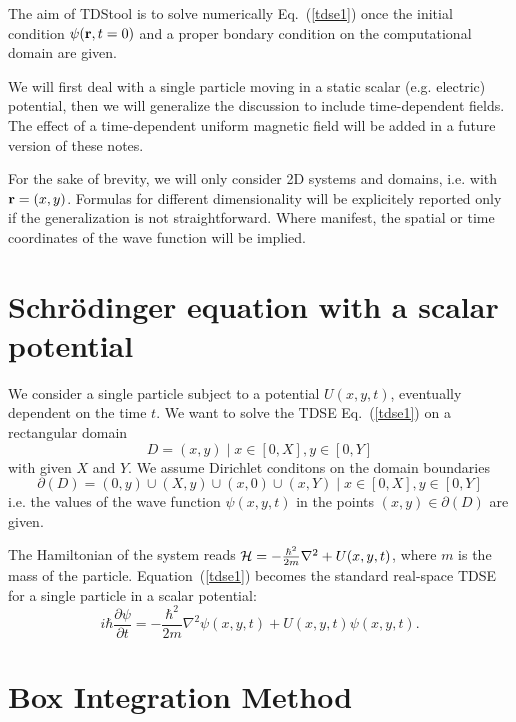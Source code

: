 \documentclass[a4paper,11pt]{article}
\begin{document}
The aim of TDStool is to solve numerically Eq.~(\ref{tdse1}) once the initial condition
$\psi({\bf r},t=0)$ and a proper bondary condition on the computational domain are given.

We will first deal with a single particle moving in a static scalar (e.g. electric) potential,
then we will generalize the discussion to include time-dependent fields. 
The effect of a time-dependent
uniform magnetic field will be added in a future version of these notes.

For the sake of brevity, we will only consider 2D systems and domains, i.e. with ${\bf r}=(x,y)$.
Formulas for different dimensionality will be explicitely reported only if the generalization
is not straightforward. Where manifest, the spatial or time coordinates of the wave function will
be implied.


\section{Schr\"{o}dinger equation with a scalar potential}

We consider a single particle subject to a potential $U(x,y,t)$, eventually dependent
on the time $t$.
We want to solve the TDSE Eq.~(\ref{tdse1}) on a rectangular domain
\begin{equation}
D = (x,y) \mid x\in[0,X], y\in[0,Y]
\end{equation}
with given $X$ and $Y$.
We assume Dirichlet conditons on the domain boundaries
\begin{equation}
\partial(D) = (0,y) \cup (X,y) \cup (x,0) \cup (x,Y) \mid x\in[0,X], y\in[0,Y]
\end{equation}
i.e. the values of the wave function $\psi(x,y,t)$ in the points $(x,y)\in\partial(D)$ are given.

The Hamiltonian of the system reads $ {\cal H} = - \frac{\hbar^2}{2m}\nabla^2 + U(x,y,t) $,
where $m$ is the mass of the particle.
Equation~(\ref{tdse1}) becomes the standard real-space TDSE for a single particle in a scalar
potential:
\begin{equation} \label{tdsestatic}
i\hbar \frac{\partial \psi}{\partial t} = - \frac{\hbar^2}{2m}\nabla^2 \psi(x,y,t)
+ U(x,y,t)\psi(x,y,t) .
\end{equation}


\section{Box Integration Method}
\end{document}
